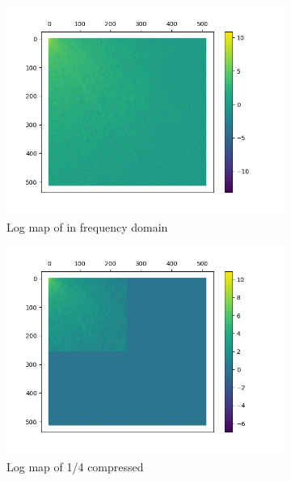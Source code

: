 \documentclass{article}
\begin{document}
	\begin{figure}[htb!]
		\centering
		\begin{subfigure}[t]{0.3\textwidth}
			\centering
			\includegraphics[width=\textwidth]{img/lena_log_map.png}
			\caption{\label{fig:lena-log}Log map of in frequency domain}
		\end{subfigure}
		\begin{subfigure}[t]{0.3\textwidth}
			\centering
			\includegraphics[width=\textwidth]{img/lena_compress_4_log_map.png}
			\caption{\label{fig:lena-log-4}Log map of 1/4 compressed}
		\end{subfigure}
		\hfill
		\begin{subfigure}[t]{0.3\textwidth}
			\centering

\end{subfigure}
\end{figure}
\end{document}
